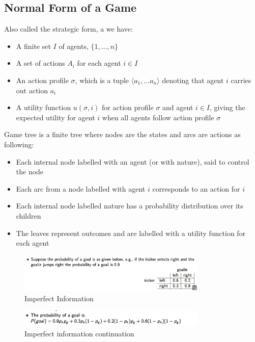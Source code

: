 \documentclass[a4paper]{article}
\theoremstyle{plain}
\theoremstyle{definition}
\newtheorem{defn}{Definition}[section]
\theoremstyle{remark}
\begin{document}
 \subsection{Normal Form of a Game}
 Also called the strategic form, a we have:
 \begin{itemize}
 	\item A finite set $I$ of agents, $\{1,\ldots,n\}$ 
	\item A set of actions $A_i$ for each agent $i \in I$ 
	\item An action profile $\sigma$, which is a tuple $\langle a_1,\ldots a_n\rangle$ denoting that agent $i$ carries out action $a_i$
	\item A utility function $u(\sigma,i)$ for action profile $\sigma$ and agent $i \in I$, giving the expected utility for agent $i$ when all agents follow action profile $\sigma$
 \end{itemize}
 \begin{tcolorbox}[colback=black!3!white,colframe=black!60!white,title=\begin{defn}Game Tree \label{Game Tree}\end{defn}]
 Game tree is a finite tree where nodes are the states and arcs are actions as following:
 \begin{itemize}
 	\item Each internal node labelled with an agent (or with nature), said to control the node
	\item Each arc from a node labelled with agent $i$ corresponds to an action for $i$ 
	\item Each internal node labelled nature has a probability distribution over its children
	\item The leaves represent outcomes and are labelled with a utility function for each agent
 \end{itemize}
 \end{tcolorbox}
 \begin{figure}[H]
 	\centering
 	\includegraphics[width=0.8\textwidth]{s1.png}
 	\caption{Imperfect Information}
 	\label{fig:}
 \end{figure}
 \begin{figure}[H]
 	\centering
 	\includegraphics[width=0.8\textwidth]{s2.png}
 	\caption{Imperfect information continuation}
 	\label{fig:s2-png}
 \end{figure}
\end{document}
